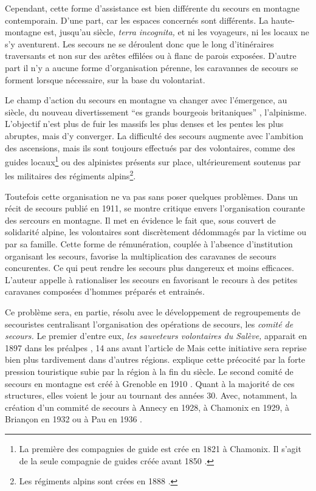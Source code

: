 Cependant, cette forme d'assistance est bien différente du secours en
montagne contemporain. D'une part, car les espaces concernés sont
différents. La haute-montagne est, jusqu'au  siècle,
\emph{terra incognita,} et ni les voyageurs, ni les locaux ne s'y
aventurent. Les secours ne se déroulent donc que le long d'itinéraires
traversants et non sur des arêtes effilées ou à flanc de parois
exposées. D'autre part il n'y a aucune forme d'organisation pérenne,
les caravannes de secours se forment lorsque nécessaire, sur la base
du volontariat.

Le champ d'action du secours en montagne va changer avec l’émergence,
au  siècle, du nouveau divertissement
\enquote{es grands bourgeois britaniques}
\autocite{Descamps2018}, l'alpinisme. L'objectif n'est plus de fuir
les massifs les plus denses et les pentes les plus abruptes, mais d'y
converger.  La difficulté des secours augmente avec l'ambition des
ascensions, mais ils sont toujours effectués par des volontaires,
comme des guides locaux\footnote{La première des compagnies de guide
  est crée en 1821 à Chamonix. Il s'agit de la seule compagnie de
  guides créée avant 1850 \autocite{ContributeursWikipedia2020b}.} ou
des alpinistes présents sur place, ultérieurement soutenus par les
militaires des régiments alpins\footnote{Les régiments alpins sont
  crées en 1888 \autocite{Mezin2016}.}.

Toutefois cette organisation ne va pas sans poser quelques
problèmes. Dans un récit de secours publié en 1911,
 \autocite{Thomas1911} se montre critique envers
l'organisation courante des sercours en montagne. Il met en évidence
le fait que, sous couvert de solidarité alpine, les volontaires sont
discrètement dédommagés par la victime ou par sa famille. Cette forme
de rémunération, couplée à l'absence d'institution organisant les
secours, favorise la multiplication des caravanes de secours
concurentes. Ce qui peut rendre les secours plus dangereux et moins
efficaces. L'auteur appelle à rationaliser les secours en favorisant
le recours à des petites caravanes composées d'hommes
préparés et entrainés.

Ce problème sera, en partie, résolu avec le développement de
regroupements de secouristes centralisant l’organisation des
opérations de secours, les \emph{comité de secours.} Le premier
d'entre eux, \emph{les sauveteurs volontaires du Salève,} apparait en
1897 dans les préalpes \autocite{CFDLD}, 14 ans avant l'article de
 Mais cette initiative sera reprise bien plus tardivement
dans d'autres régions. \textcite{Caille2016} explique cette précocité
par la forte pression touristique subie par la région à la fin du
 siècle.  Le second comité de secours en montagne est
créé à Grenoble en 1910 \autocite{CFDLD,Caille2016}. Quant à la
majorité de ces structures, elles voient le jour au tournant des
années 30. Avec, notamment, la création d'un commité de secours à
Annecy en 1928, à Chamonix en 1929, à Briançon en 1932 ou à Pau en
1936 \autocite{CFDLD, Devies1946}.

